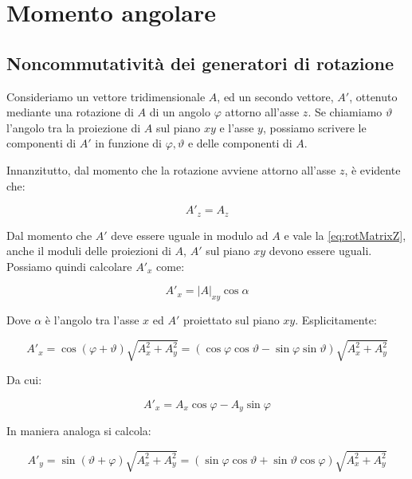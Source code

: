 \section{Momento angolare}

\subsection{Noncommutativit\`a dei generatori di rotazione}

Consideriamo un vettore tridimensionale $A$, ed un secondo vettore, $A'$, ottenuto mediante una rotazione di $A$ di un angolo $\varphi$ attorno all'asse $z$. Se chiamiamo $\vartheta$ l'angolo tra la proiezione di $A$ sul piano $xy$ e l'asse $y$, possiamo scrivere le componenti di $A'$ in funzione di $\varphi, \vartheta$ e delle componenti di $A$.

Innanzitutto, dal momento che la rotazione avviene attorno all'asse $z$, \`e evidente che:

	\begin{equation} \label{eq:rotMatrixZ}
		A'_z = A_z
	\end{equation}

Dal momento che $A'$ deve essere uguale in modulo ad $A$ e vale la \eqref{eq:rotMatrixZ}, anche il moduli delle proiezioni di $A$, $A'$ sul piano $xy$ devono essere uguali. Possiamo quindi calcolare $A'_x$ come:

	\begin{equation}
		A'_x = \left | A \right |_{xy} \cos \alpha
	\end{equation}

Dove $\alpha$ \`e l'angolo tra l'asse $x$ ed $A'$ proiettato sul piano $xy$. Esplicitamente:

	\begin{equation}
		A'_x = \cos(\varphi + \vartheta) \sqrt{A_x^2 + A_y^2} = (\cos \varphi \cos \vartheta - \sin \varphi \sin \vartheta)
			\sqrt{A_x^2 + A_y^2}
	\end{equation}

Da cui:

	\begin{equation} \label{eq:rotMatrixX}
		A'_x = A_x \cos \varphi - A_y \sin \varphi
	\end{equation}

In maniera analoga si calcola:

	\begin{equation}
		A'_y = \sin( \vartheta + \varphi ) \sqrt{A_x^2 + A_y^2} = (\sin \varphi \cos \vartheta + \sin \vartheta \cos \varphi)
			\sqrt{A_x^2 + A_y^2}
	\end{equation}

